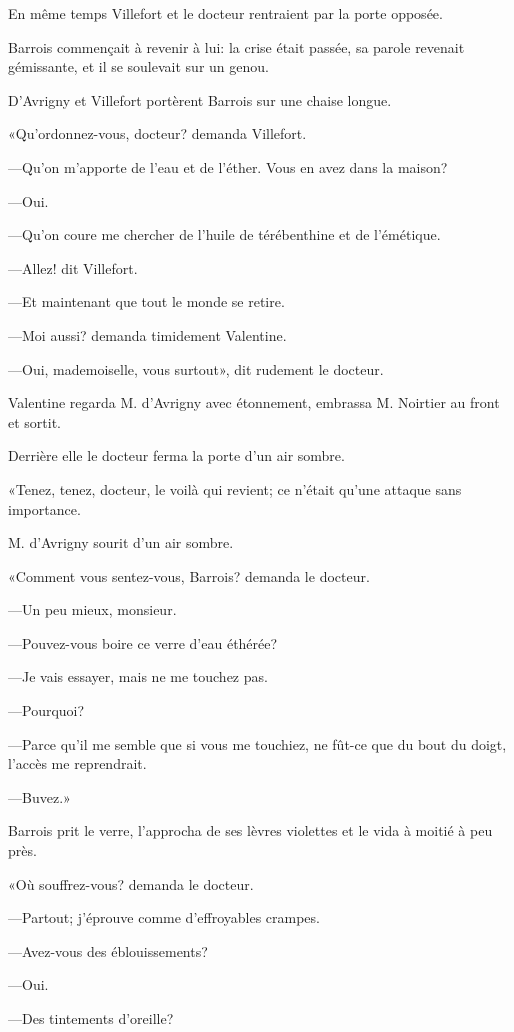 En même temps Villefort et le docteur rentraient par la porte opposée. 

Barrois commençait à revenir à lui: la crise était passée, sa parole revenait gémissante, et il se soulevait sur un genou. 

D'Avrigny et Villefort portèrent Barrois sur une chaise longue.  

«Qu'ordonnez-vous, docteur? demanda Villefort. 

—Qu'on m'apporte de l'eau et de l'éther. Vous en avez dans la maison? 

—Oui. 

—Qu'on coure me chercher de l'huile de térébenthine et de l'émétique. 

—Allez! dit Villefort. 

—Et maintenant que tout le monde se retire. 

—Moi aussi? demanda timidement Valentine. 

—Oui, mademoiselle, vous surtout», dit rudement le docteur. 

Valentine regarda M. d'Avrigny avec étonnement, embrassa M. Noirtier au front et sortit. 

Derrière elle le docteur ferma la porte d'un air sombre. 

«Tenez, tenez, docteur, le voilà qui revient; ce n'était qu'une attaque sans importance. 

M. d'Avrigny sourit d'un air sombre. 

«Comment vous sentez-vous, Barrois? demanda le docteur. 

—Un peu mieux, monsieur. 

—Pouvez-vous boire ce verre d'eau éthérée? 

—Je vais essayer, mais ne me touchez pas. 

—Pourquoi? 

—Parce qu'il me semble que si vous me touchiez, ne fût-ce que du bout du doigt, l'accès me reprendrait. 

—Buvez.» 

Barrois prit le verre, l'approcha de ses lèvres violettes et le vida à moitié à peu près. 

«Où souffrez-vous? demanda le docteur. 

—Partout; j'éprouve comme d'effroyables crampes. 

—Avez-vous des éblouissements? 

—Oui. 

—Des tintements d'oreille? 

